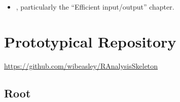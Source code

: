 \documentclass[
]{book}
\providecommand{\tightlist}{%
  \setlength{\itemsep}{0pt}\setlength{\parskip}{0pt}}
\begin{document}
\begin{itemize}
\tightlist
\item
  \citep{gillespie}, particularly the ``Efficient input/output'' chapter.
\end{itemize}

\hypertarget{repo-prototype}{%
\chapter{Prototypical Repository}\label{repo-prototype}}

\url{https://github.com/wibeasley/RAnalysisSkeleton}

\hypertarget{repo-root}{%
\section{Root}\label{repo-root}}
\end{document}
